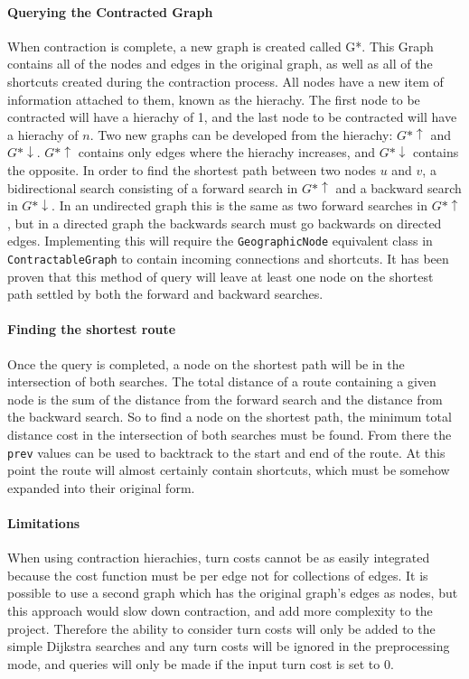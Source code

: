 \documentclass[11pt,twoside,a4paper]{report}
\begin{document}
\paragraph{Querying the Contracted Graph}
When contraction is complete, a new graph is created called G*. This Graph contains all of the nodes and edges in the original graph, as well as all of the shortcuts created during the contraction process.
All nodes have a new item of information attached to them, known as the hierachy. The first node to be contracted will have a hierachy of 1, and the last node to be contracted will have a hierachy of $n$. 
Two new graphs can be developed from the hierachy:
$G*\uparrow$ and $G*\downarrow$. $G*\uparrow$ contains only edges where the hierachy increases, and $G*\downarrow$ contains the opposite. In order to find the shortest path between two nodes $u$ and $v$, a bidirectional search
 consisting of a forward search in $G*\uparrow$ and a backward search in $G*\downarrow$. In an undirected graph this is the same as two forward searches in $G*\uparrow$, but in a directed graph the backwards search must go backwards on directed edges.
Implementing this will require the \texttt{GeographicNode} equivalent class in \texttt{ContractableGraph} to contain incoming connections and shortcuts. It has been proven\cite{Geisberger2012} that this method of query will leave at least one node on the shortest path settled by both the forward and backward searches.
\paragraph{Finding the shortest route}
Once the query is completed, a node on the shortest path will be in the intersection of both searches. The total distance of a route containing a given node is the sum of the distance from the forward search and the distance from the backward search. So to find a node on the shortest path,
the minimum total distance cost in the intersection of both searches must be found. From there the \texttt{prev} values can be used to backtrack to the start and end of the route. At this point the route will almost certainly contain shortcuts, which must be somehow expanded into their original form.
\paragraph{Limitations}
When using contraction hierachies, turn costs cannot be as easily integrated because the cost function must be per edge not for collections of edges. It is possible to use a second graph which has the original graph's edges as nodes, but this approach would slow down contraction, and add more complexity to the project.
Therefore the ability to consider turn costs will only be added to the simple Dijkstra searches and any turn costs will be ignored in the preprocessing mode, and queries will only be made if the input turn cost is set to 0. 
\end{document}

